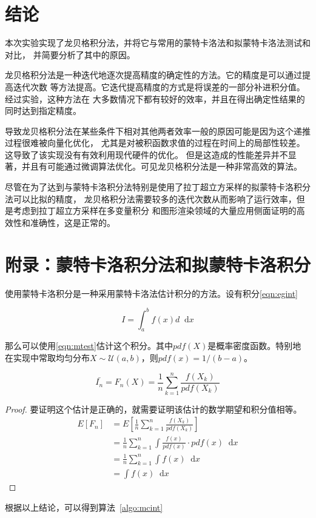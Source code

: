 \documentclass[a4paper,twoside]{article}
\newcommand*{\dif}{\mathop{}\!\mathrm{d}}
\begin{document}
\begin{spacing}{1.2}
\section{结论}

本次实验实现了龙贝格积分法，并将它与常用的蒙特卡洛法和拟蒙特卡洛法测试和对比，
并简要分析了其中的原因。

龙贝格积分法是一种迭代地逐次提高精度的确定性的方法。它的精度是可以通过提高迭代次数
等方法提高。它迭代提高精度的方式是将误差的一部分补进积分值。经过实验，这种方法在
大多数情况下都有较好的效率，并且在得出确定性结果的同时达到指定精度。

导致龙贝格积分法在某些条件下相对其他两者效率一般的原因可能是因为这个递推过程很难被向量化优化，
尤其是对被积函数求值的过程在时间上的局部性较差。这导致了该实现没有有效利用现代硬件的优化。
但是这造成的性能差异并不显著，并且有可能通过微调算法优化。可见龙贝格积分法是一种非常高效的算法。

尽管在为了达到与蒙特卡洛积分法特别是使用了拉丁超立方采样的拟蒙特卡洛积分法可以比拟的精度，
龙贝格积分法需要较多的迭代次数从而影响了运行效率，但是考虑到拉丁超立方采样在多变量积分
和图形渲染领域的大量应用侧面证明的高效性和准确性，这是正常的。


\clearpage

\appendix

\section{附录：蒙特卡洛积分法和拟蒙特卡洛积分}

使用蒙特卡洛积分是一种采用蒙特卡洛法估计积分的方法。设有积分\eqref{eqn:egint}

\begin{equation}
	\label{eqn:egint}
	I=\int_a^b f(x)d \dif x
\end{equation}

那么可以使用\eqref{eqn:mtest}估计这个积分。其中$pdf(X)$是概率密度函数。特别地
在实现中常取均匀分布$X\sim \mathcal{U}(a,b)$，则$pdf(x)=1/(b-a)$。

\begin{equation}
	\label{eqn:mtest}
	\bar{I_n}=F_n(X)=\frac{1}{n}\sum_{k=1}^n\frac{f(X_k)}{pdf(X_k)}
\end{equation}

\begin{proof}
	要证明这个估计是正确的，就需要证明该估计的数学期望和积分值相等。
\begin{align*}
	E[F_n]&=E\left[\frac{1}{n}\sum_{k=1}^n\frac{f(X_k)}{pdf(X_k)}\right]\\
	&=\frac{1}{n}\sum_{k=1}^n\int \frac{f(x)}{pdf(x)} \cdot pdf(x) \dif x\\
	&=\frac{1}{n}\sum_{k=1}^n\int f(x) \dif x\\
	&=\int f(x) \dif x
\end{align*}
\end{proof}
根据以上结论，可以得到算法~\ref{algo:mcint}


\end{spacing}
\end{document}
